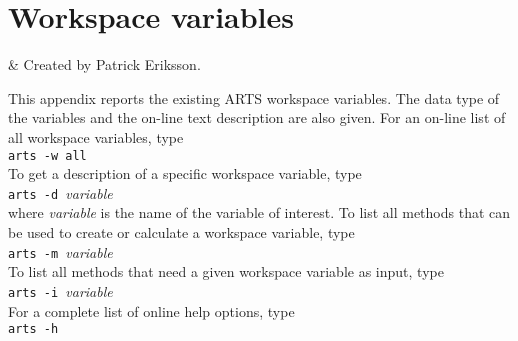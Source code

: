\chapter{Workspace variables}
 \label{app:wsv}


 & Created by Patrick Eriksson. \\
\stophistory

 This appendix reports the existing ARTS workspace variables. The
 data type of the variables and the on-line text description are also
 given. For an on-line list of all workspace variables, type\\

 \verb|arts -w all| \\

 \noindent
 To get a description of a specific workspace variable, type\\

 \verb|arts -d |{\it variable} \\

 \noindent
 where {\it variable} is the name of the variable of interest. To list
 all methods that can be used to create or calculate a workspace variable,
 type \\

 \verb|arts -m |{\it variable} \\

 \noindent
 To list all methods that need a given workspace variable as input,
 type \\

 \verb|arts -i |{\it variable} \\

 \noindent
 For a complete list of online help options, type\\ 

 \verb|arts -h| \\
 
 {\footnotesize
  }



